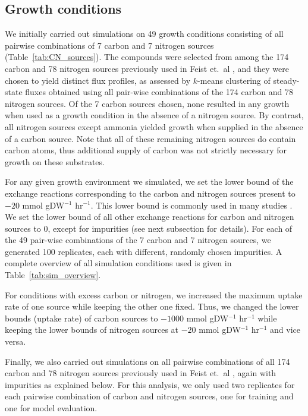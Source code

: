 \documentclass[12pt]{article}
\begin{document}
\subsection{Growth conditions} 
We initially carried out simulations on 49 growth conditions consisting of all pairwise combinations of 7 carbon and 7 nitrogen sources (Table~\ref{tab:CN_sources}). The compounds were selected from among the 174 carbon and 78 nitrogen sources previously used in Feist et.\ al \cite{Feistetal2007}, and they were chosen to yield distinct flux profiles, as assessed by $k$-means clustering of steady-state fluxes obtained using all pair-wise combinations of the 174 carbon and 78 nitrogen sources. Of the 7 carbon sources chosen, none resulted in any growth when used as a growth condition in the absence of a nitrogen source. By contrast, all nitrogen sources except ammonia yielded growth when supplied in the absence of a carbon source. Note that all of these remaining nitrogen sources do contain carbon atoms, thus additional supply of carbon was not strictly necessary for growth on these substrates.

For any given growth environment we simulated, we set the lower bound of the exchange reactions corresponding to the carbon and nitrogen sources present to $-20$ mmol gDW$^{-1}$ hr$^{-1}$. This lower bound is commonly used in many studies \cite{Feistetal2007}. We set the lower bound of all other exchange reactions for carbon and nitrogen sources to 0, except for impurities (see next subsection for details). For each of the 49 pair-wise combinations of the 7 carbon and 7 nitrogen sources, we generated 100 replicates, each with different, randomly chosen impurities. A complete overview of all simulation conditions used is given in Table~\ref{tab:sim_overview}.

For conditions with excess carbon or nitrogen, we increased the maximum uptake rate of one source while keeping the other one fixed. Thus, we changed the lower bounds (uptake rate) of carbon sources to $-1000$ mmol gDW$^{-1}$ hr$^{-1}$ while keeping the lower bounds of nitrogen sources at $-20$ mmol gDW$^{-1}$ hr$^{-1}$ and vice versa. 

Finally, we also carried out simulations on all pairwise combinations of all 174 carbon and 78 nitrogen sources previously used in Feist et.\ al \cite{Feistetal2007}, again with impurities as explained below. For this analysis, we only used two replicates for each pairwise combination of carbon and nitrogen sources, one for training and one for model evaluation.
\end{document}
